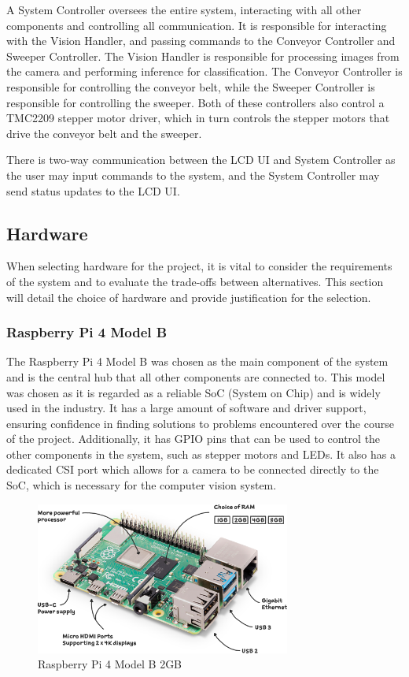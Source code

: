 A System Controller oversees the entire system, interacting with all other components and controlling all communication. It is responsible for interacting with the Vision Handler, and passing commands to the Conveyor Controller and Sweeper Controller. The Vision Handler is responsible for processing images from the camera and performing inference for classification. The Conveyor Controller is responsible for controlling the conveyor belt, while the Sweeper Controller is responsible for controlling the sweeper. Both of these controllers also control a TMC2209 stepper motor driver, which in turn controls the stepper motors that drive the conveyor belt and the sweeper.

There is two-way communication between the LCD UI and System Controller as the user may input commands to the system, and the System Controller may send status updates to the LCD UI.

\subsection{Hardware}
\label{sec:hardware}

When selecting hardware for the project, it is vital to consider the requirements of the system and to evaluate the trade-offs between alternatives. This section will detail the choice of hardware and provide justification for the selection.

\subsubsection{Raspberry Pi 4 Model B}
The Raspberry Pi 4 Model B \cite{pi4} was chosen as the main component of the system and is the central hub that all other components are connected to. This model was chosen as it is regarded as a reliable SoC (System on Chip) and is widely used in the industry. It has a large amount of software and driver support, ensuring confidence in finding solutions to problems encountered over the course of the project. Additionally, it has GPIO pins that can be used to control the other components in the system, such as stepper motors and LEDs. It also has a dedicated CSI port which allows for a camera to be connected directly to the SoC, which is necessary for the computer vision system.

\begin{figure}[H]
    \begin{minipage}[t]{\textwidth}
      \centering
      \includegraphics[width=\textwidth,height=5cm, keepaspectratio]{imgs/parts/pi4_labelled.png}
      \caption{Raspberry Pi 4 Model B 2GB \cite{pi4}}
    \end{minipage}
\end{figure}

